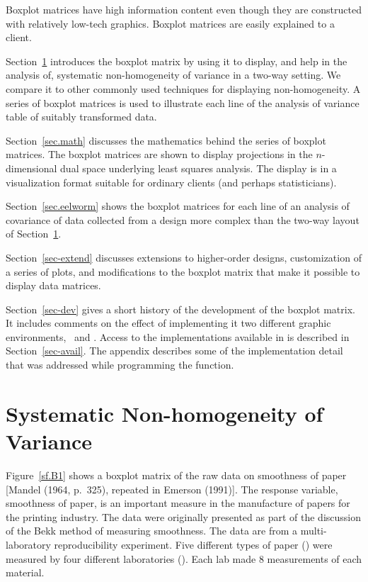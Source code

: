 Boxplot matrices have high information content even though they
are constructed with relatively low-tech graphics.  Boxplot
matrices are easily explained to a client.


Section~\ref{sec-nonhom} introduces the boxplot matrix by using
it to display, and help in the analysis of, systematic
non-homogeneity of variance in a two-way setting.  We compare it
to other commonly used techniques for displaying non-homogeneity.
A series of boxplot matrices is used to illustrate each line of
the analysis of variance table of suitably transformed data.

Section~\ref{sec.math} discusses the mathematics behind the
series of boxplot matrices.  The boxplot matrices are shown to
display projections in the $n$-dimensional dual space underlying
least squares analysis.  The display is in a visualization format
suitable for ordinary clients (and perhaps statisticians).

Section~\ref{sec.eelworm} shows the boxplot matrices for each
line of an analysis of covariance of data collected from a design
more complex than the two-way layout of Section~\ref{sec-nonhom}.

Section~\ref{sec-extend} discusses extensions to higher-order
designs, customization of a series of plots, and modifications to
the boxplot matrix that make it possible to display data
matrices.

Section~\ref{sec-dev} gives a short history of the development of
the boxplot matrix.  It includes comments on the effect of
implementing it two different graphic environments, \iS\ and \iX.
Access to the implementations available in  is
described in Section~\ref{sec-avail}.
The appendix describes some of the implementation detail that
was addressed while programming the function.


\section{Systematic Non-homogeneity of Variance}
\label{sec-nonhom}

Figure~\ref{sf.B1} shows a boxplot matrix of the raw data on smoothness of
paper [Mandel (1964,
p.~325), repeated in Emerson (1991)].  The response variable, smoothness of
paper, is an important measure in the manufacture of papers for the
printing industry.  The data were originally presented as part of the
discussion of the Bekk method of measuring smoothness.
The data are from a multi-laboratory reproducibility experiment.  Five
different types of paper () were measured by four different
laboratories ().  Each lab made 8 measurements of each material.

